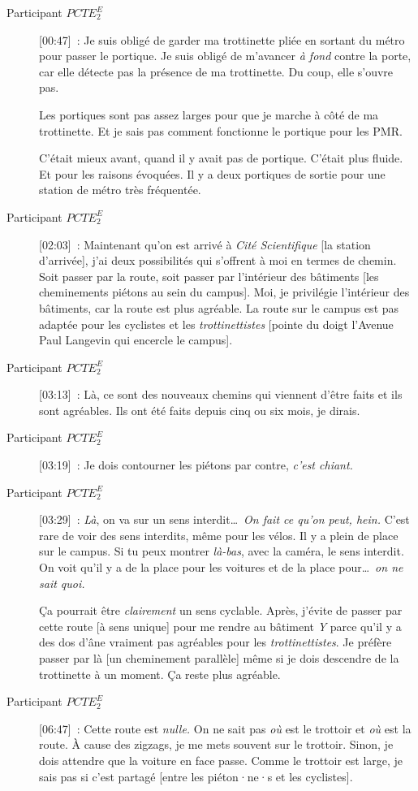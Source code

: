 \begin{description}
    \item[Participant \(PCTE^{E}_{2}\)] [00:47]~: Je suis obligé de garder ma trottinette pliée en sortant du métro pour passer le portique. Je suis obligé de m'avancer \textsl{à fond} contre la porte, car elle détecte pas la présence de ma trottinette. Du coup, elle s'ouvre pas.%

    Les portiques sont pas assez larges pour que je marche à côté de ma trottinette. Et je sais pas comment fonctionne le portique pour les PMR.%

    C'était mieux avant, quand il y avait pas de portique. C'était plus fluide. Et pour les raisons évoquées. Il y a deux portiques de sortie pour une station de métro très fréquentée.
    \item[Participant \(PCTE^{E}_{2}\)] [02:03]~: Maintenant qu’on est arrivé à \textsl{Cité Scientifique} [la station d'arrivée], j’ai deux possibilités qui s’offrent à moi en termes de chemin. Soit passer par la route, soit passer par l’intérieur des bâtiments [les cheminements piétons au sein du campus]. Moi, je privilégie l’intérieur des bâtiments, car la route est plus agréable. La route sur le campus est pas adaptée pour les cyclistes et les \textsl{trottinettistes} [pointe du doigt l'Avenue Paul Langevin qui encercle le campus].
    \item[Participant \(PCTE^{E}_{2}\)] [03:13]~: Là, ce sont des nouveaux chemins qui viennent d’être faits et ils sont agréables. Ils ont été faits depuis cinq ou six mois, je dirais.
    \item[Participant \(PCTE^{E}_{2}\)] [03:19]~: Je dois contourner les piétons par contre, \textsl{c'est chiant.}
    \item[Participant \(PCTE^{E}_{2}\)] [03:29]~: \textsl{Là}, on va sur un sens interdit\dots~\textsl{On fait ce qu'on peut, hein.} C'est rare de voir des sens interdits, même pour les vélos. Il y a plein de place sur le campus. Si tu peux montrer \textsl{là-bas}, avec la caméra, le sens interdit. On voit qu'il y a de la place pour les voitures et de la place pour\dots~\textsl{on ne sait quoi.}%

    Ça pourrait être \textsl{clairement} un sens cyclable. Après, j’évite de passer par cette route [à sens unique] pour me rendre au bâtiment \textsl{Y} parce qu’il y a des dos d’âne vraiment pas agréables pour les \textsl{trottinettistes}. Je préfère passer par là [un cheminement parallèle] même si je dois descendre de la trottinette à un moment. Ça reste plus agréable.
    \item[Participant \(PCTE^{E}_{2}\)] [06:47]~: Cette route est \textsl{nulle.} On ne sait pas \textsl{où} est le trottoir et \textsl{où} est la route. À cause des zigzags, je me mets souvent sur le trottoir. Sinon, je dois attendre que la voiture en face passe. Comme le trottoir est large, je sais pas si c'est partagé [entre les piéton·ne·s et les cyclistes].%
\end{description}

